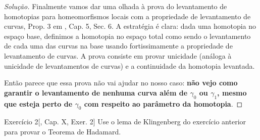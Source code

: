 \begin{proof}[Solução]
Finalmente vamos dar uma olhada à prova do levantamento de homotopias para homeomorfismos locais com a propriedade de levantamento de curvas, Prop. 3 em \cite{docsu}, Cap. 5, Sec. 6. A estratégia é clara: dada uma homotopia no espaço base, definimos a homotopia no espaço total como sendo o levantamento de cada uma das curvas na base usando fortissimamente a propriedade de levantamento de curvas. A prova consiste em provar unicidade (análoga à unicidade de levantamentos de curvas) e a continuidade da homotopia levantada.

Então parece que essa prova não vai ajudar no nosso caso: \textbf{não vejo como garantir o levantamento de nenhuma curva além de \(\gamma_0\) ou \(\gamma_1\), mesmo que esteja perto de \(\gamma_0\) com respeito ao parâmetro da homotopia}.

\end{proof}

\begin{thing6}{Exercício 2}[\cite{doc}, Cap. X, Exer. 2]\label{exer:2}\leavevmode
Use o lema de Klingenberg do exercício anterior para provar o Teorema de Hadamard.
\end{thing6}

